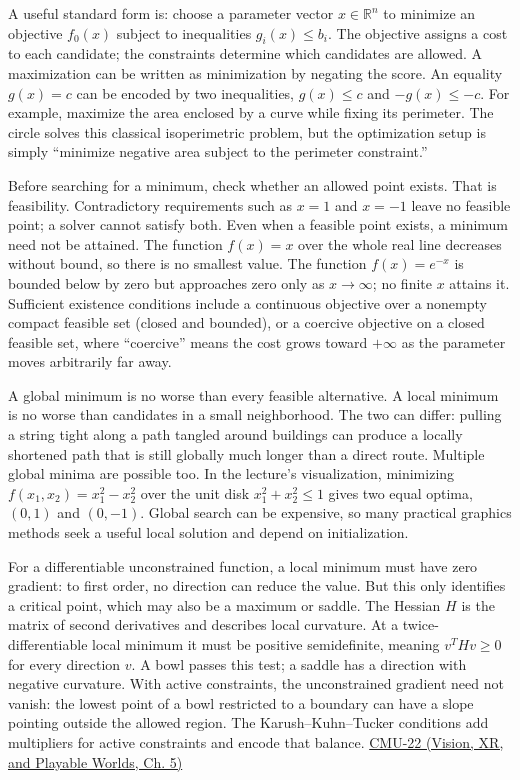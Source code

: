 \hypertarget{04-visual-computing-ii-ch029-feasible-sets-existence-and-the-difference-between-local-and-global}{}

A useful standard form is: choose a parameter vector \(x\in\mathbb R^n\) to minimize an objective \(f_0(x)\) subject to inequalities \(g_i(x)\le b_i\). The objective assigns a cost to each candidate; the constraints determine which candidates are allowed. A maximization can be written as minimization by negating the score. An equality \(g(x)=c\) can be encoded by two inequalities, \(g(x)\le c\) and \(-g(x)\le -c\). For example, maximize the area enclosed by a curve while fixing its perimeter. The circle solves this classical isoperimetric problem, but the optimization setup is simply ``minimize negative area subject to the perimeter constraint.''

Before searching for a minimum, check whether an allowed point exists. That is feasibility. Contradictory requirements such as \(x=1\) and \(x=-1\) leave no feasible point; a solver cannot satisfy both. Even when a feasible point exists, a minimum need not be attained. The function \(f(x)=x\) over the whole real line decreases without bound, so there is no smallest value. The function \(f(x)=e^{-x}\) is bounded below by zero but approaches zero only as \(x\to\infty\); no finite \(x\) attains it. Sufficient existence conditions include a continuous objective over a nonempty compact feasible set (closed and bounded), or a coercive objective on a closed feasible set, where ``coercive'' means the cost grows toward \(+\infty\) as the parameter moves arbitrarily far away.

A global minimum is no worse than every feasible alternative. A local minimum is no worse than candidates in a small neighborhood. The two can differ: pulling a string tight along a path tangled around buildings can produce a locally shortened path that is still globally much longer than a direct route. Multiple global minima are possible too. In the lecture's visualization, minimizing \(f(x_1,x_2)=x_1^2-x_2^2\) over the unit disk \(x_1^2+x_2^2\le1\) gives two equal optima, \((0,1)\) and \((0,-1)\). Global search can be expensive, so many practical graphics methods seek a useful local solution and depend on initialization.

For a differentiable unconstrained function, a local minimum must have zero gradient: to first order, no direction can reduce the value. But this only identifies a critical point, which may also be a maximum or saddle. The Hessian \(H\) is the matrix of second derivatives and describes local curvature. At a twice-differentiable local minimum it must be positive semidefinite, meaning \(v^T H v\ge0\) for every direction \(v\). A bowl passes this test; a saddle has a direction with negative curvature. With active constraints, the unconstrained gradient need not vanish: the lowest point of a bowl restricted to a boundary can have a slope pointing outside the allowed region. The Karush--Kuhn--Tucker conditions add multipliers for active constraints and encode that balance. \href{../07-Vision-XR-and-Playable-Worlds/main.pdf\#nameddest=04-visual-computing-ii-ch036-cmu-22---optimization}{CMU-22 (Vision, XR, and Playable Worlds, Ch. 5)}

